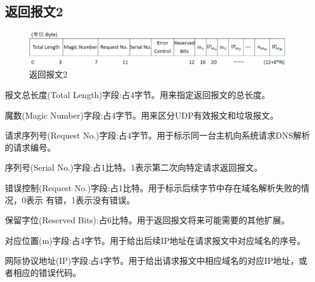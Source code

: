 \subsection{返回报文2}
\begin{figure}[H]
\centering
\includegraphics[keepaspectratio,scale=0.4]{pitures/response2.png}
\caption{返回报文2}
\end{figure}
	\begin{asparaitem}
		\item{报文总长度(Total Length)字段:占4字节。用来指定返回报文的总长度。}
		\item{魔数(Magic Number)字段:占4字节。用来区分UDP有效报文和垃圾报文。}
		\item{请求序列号(Request No.)字段:占4字节。用于标示同一台主机向系统请求DNS解析的请求编号。}
		\item{序列号(Serial No.)字段:占1比特。1表示第二次向特定请求返回报文。}
		\item{错误控制(Request No.)字段:占1比特。用于标示后续字节中存在域名解析失败的情况，0表示
		有错，1表示没有错误。}
		\item{保留字位(Reserved Bits):占6比特。用于返回报文将来可能需要的其他扩展。}
		\item{对应位置(m)字段:占4字节。用于给出后续IP地址在请求报文中对应域名的序号。}	
		\item{网际协议地址(IP)字段:占4字节。用于给出请求报文中相应域名的对应IP地址，或者相应的错误代码。}
	\end{asparaitem}

%
